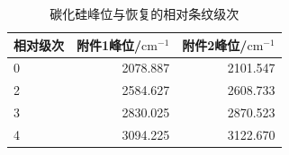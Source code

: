 \begin{table}[htbp]\centering
\caption{碳化硅峰位与恢复的相对条纹级次}\label{tab:sic-peaks}
\begin{tabular}{lrr}
\toprule
相对级次 & 附件1峰位/$\mathrm{cm}^{-1}$ & 附件2峰位/$\mathrm{cm}^{-1}$\\\midrule
0 & 2078.887 & 2101.547\\
2 & 2584.627 & 2608.733\\
3 & 2830.025 & 2870.523\\
4 & 3094.225 & 3122.670\\
\bottomrule
\end{tabular}\end{table}
